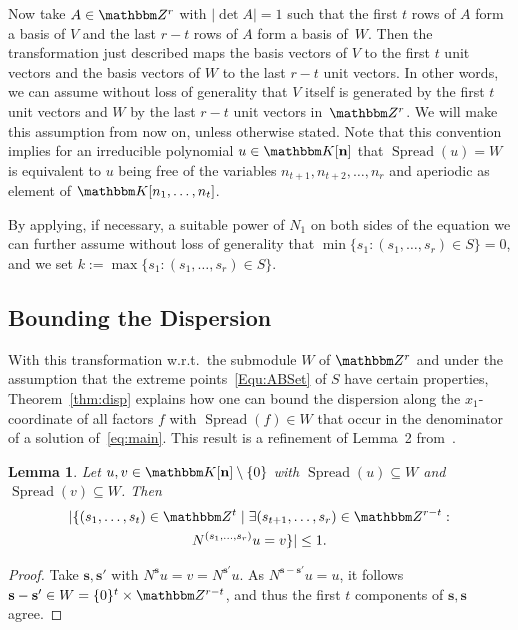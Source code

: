 \documentclass[a4paper]{sig-alternate}
\let\set\mathbbm
\def\vec#1{\mathbf{#1}}
\def\spread{\operatorname{Spread}}
\def\K{\set K}
\newtheorem{lemma}{Lemma}
\begin{document}
Now take $A\in\set Z^r$ with $|\det A|=1$ such that the first $t$ rows of $A$
form a basis of $V$ and the last $r-t$ rows of $A$ form
a basis of~$W$. Then the transformation just described maps
the basis vectors of $V$ to the first $t$ unit vectors and the basis
vectors of $W$ to the last $r-t$ unit vectors. In other words, we can
assume without loss of generality that $V$ itself is generated by the
first $t$ unit vectors and $W$ by the last $r-t$ unit vectors in~$\set Z^r$.
We will make this assumption from now on, unless otherwise stated.
Note that this convention implies for an irreducible polynomial $u\in\K[\vec n]$
that $\spread(u)=W$ is equivalent to $u$ being free of the variables
$n_{t+1},n_{t+2},\dots,n_r$ and aperiodic as element of $\K[n_1,\dots,n_t]$.

By applying, if necessary, a suitable power of $N_1$ on both sides of the
equation we can further assume without loss of generality that
$\min\{s_1:(s_1,\dots,s_r)\in S\}=0$, and we set
$k:=\max\{s_1:(s_1,\dots,s_r)\in S\}$.
\subsection{Bounding the Dispersion}

With this transformation w.r.t.\ the submodule $W$ of $\set Z^r$ and under the assumption that the extreme points~\eqref{Equ:ABSet} of $S$ have certain properties, Theorem~\ref{thm:disp} explains how one can bound the dispersion along the $x_1$-coordinate of all factors $f$ with $\spread(f)\in W$ that occur in the denominator of a solution of~\eqref{eq:main}. This result is a refinement of Lemma~2 from~\cite{kauers10b}.

\begin{lemma}\label{Lemma:UniqueTComponents}
Let $u,v\in\set K[\vec n]\setminus\{0\}$ with $\spread(u)\subseteq W$ and $\spread(v)\subseteq  W$. Then
\begin{multline*}
|\{(s_1,\dots,s_t)\in\set Z^t\mid\exists (s_{t+1},\dots,s_r)\in\set Z^{r-t}:\\
N^{(s_1,\dots,s_r)}u=v\}|\leq 1.
\end{multline*}
\end{lemma}
\begin{proof}
Take $\vec s,\vec s'$ with $N^{\vec s}u=v=N^{\vec s'}u$. As $N^{\vec s-\vec s'}u=u$, it follows $\vec{s}-\vec{s}'\in W=\{0\}^t\times\set Z^{r-t}$, and thus the first $t$ components of $\vec s,\vec s$ agree.
\end{proof}
\end{document}
